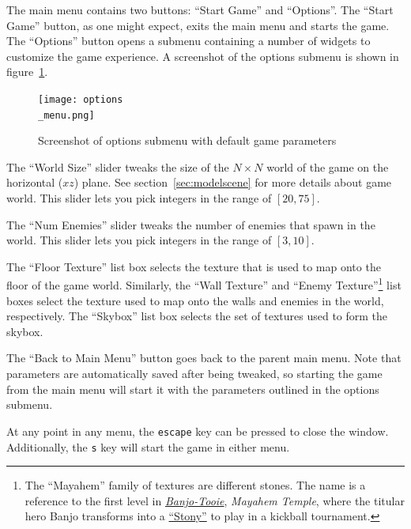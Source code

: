 \documentclass {article}
\begin{document}
The main menu contains two buttons: ``Start Game'' and ``Options''. The ``Start Game'' button, as one might expect, exits the main menu and starts the game. The ``Options'' button opens a submenu containing a number of widgets to customize the game experience. A screenshot of the options submenu is shown in figure~\ref{fig:optionsmenu}.
\begin{figure}[H]
  \begin{center}
  \texttt{[image: options\\\_menu.png]}
  \end{center}
  \caption{Screenshot of options submenu with default game parameters}\label{fig:optionsmenu}
\end{figure}

The ``World Size'' slider tweaks the size of the $N \times N$ world of the game on the horizontal ($xz$) plane. See section~\ref{sec:modelscene} for more details about game world. This slider lets you pick integers in the range of $[20, 75]$.

The ``Num Enemies'' slider tweaks the number of enemies that spawn in the world. This slider lets you pick integers in the range of $[3, 10]$.

The ``Floor Texture'' list box selects the texture that is used to map onto the floor of the game world. Similarly, the ``Wall Texture'' and ``Enemy Texture''\footnote{The ``Mayahem'' family of textures are different stones. The name is a reference to the first level in \href{https://en.wikipedia.org/wiki/Banjo-Tooie}{\textit{Banjo-Tooie}}, \textit{Mayahem Temple}, where the titular hero Banjo transforms into a \href{https://banjokazooie.fandom.com/wiki/Stony_Banjo}{``Stony''} to play in a kickball tournament.} list boxes select the texture used to map onto the walls and enemies in the world, respectively. The ``Skybox'' list box selects the set of textures used to form the skybox.

The ``Back to Main Menu'' button goes back to the parent main menu. Note that parameters are automatically saved after being tweaked, so starting the game from the main menu will start it with the parameters outlined in the options submenu.

At any point in any menu, the \texttt{escape} key can be pressed to close the window. Additionally, the \texttt{s} key will start the game in either menu.
\end{document}
